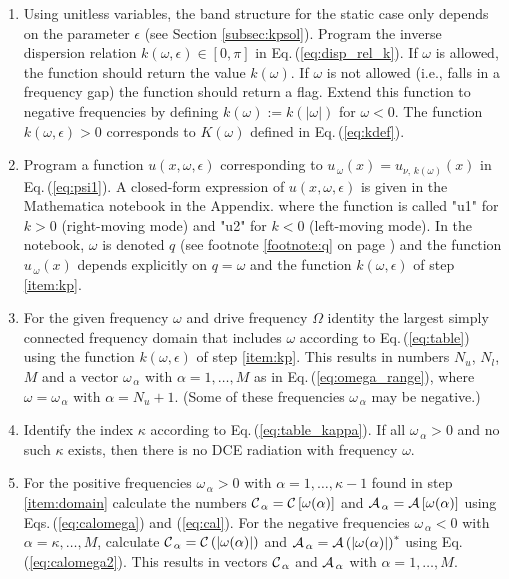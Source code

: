 \begin{enumerate}

\item \label{item:kp} 
Using unitless variables,
the band structure for the static case only depends on the parameter $\epsilon$
(see Section \ref{subsec:kpsol}).
Program the inverse dispersion relation $k(\omega, \epsilon) \in [0, \pi]$ 
in Eq.\,(\ref{eq:disp_rel_k}). 
If $\omega$ is allowed, the function should return the value $k(\omega)$. If $\omega$ is not allowed 
(i.e., falls in a frequency gap) the function should return a flag.
Extend this function to negative frequencies by defining $k(\omega) := k(|\omega|)$ for $\omega < 0$.
The function $k(\omega, \epsilon) > 0$ corresponds to $K(\omega)$ defined in Eq.\,(\ref{eq:kdef}).

\item \label{item:u}
Program a function $u(x, \omega, \epsilon)$ corresponding to 
$u_{\,\omega}(x) = u_{\nu, \, k(\omega)}(x)$ in Eq.\,(\ref{eq:psi1}).
A closed-form expression of $u(x, \omega, \epsilon)$ is given in the Mathematica notebook in the Appendix. 
%
where the function is called "u1" for $k>0$ (right-moving mode) and "u2" for $k<0$ (left-moving mode). 
In the notebook, $\omega$ is denoted $q$
(see footnote \ref{footnote:q} on page \pageref{footnote:q}) and the function 
$u_{\,\omega}(x)$ depends explicitly on $q = \omega$ and the function 
$k(\omega,\epsilon)$ of step \ref{item:kp}.
        
\item  \label{item:domain}
For the given frequency $\omega$ and drive frequency $\Omega$ identity the largest simply connected 
frequency domain that includes $\omega$ according to Eq.\,(\ref{eq:table}) using the function $k(\omega,\epsilon)$
of step \ref{item:kp}. This results in numbers
$N_u$, $N_l$, $M$ and a vector $\omega_{\,\alpha}$ with $\alpha = 1, \ldots, M$ as in 
Eq.\,(\ref{eq:omega_range}), where $\omega = \omega_{\,\alpha}$ with $\alpha = N_u + 1$.
(Some of these frequencies $\omega_{\,\alpha}$ may be negative.)

\item \label{item:kappa} 
Identify the index $\kappa$ according to Eq.\,(\ref{eq:table_kappa}). 
If all $\omega_{\,\alpha} > 0$ and no such $\kappa$ exists, then there is no DCE radiation with frequency $\omega$.

\item For the positive frequencies $\omega_{\,\alpha}>0$ with $\alpha = 1, \ldots, \kappa-1$
found in step \ref{item:domain} 
calculate the numbers ${\cal C}_{\,\alpha} = {\cal C}\left[\omega(\alpha)\right]$ and 
${\cal A}_{\,\alpha} = {\cal A}\left[\omega(\alpha)\right]$ using Eqs.\,(\ref{eq:calomega}) and (\ref{eq:cal}).
For the negative frequencies $\omega_{\,\alpha}<0$ with $\alpha = \kappa, \ldots, M$, 
calculate ${\cal C}_{\,\alpha} = {\cal C}\left(|\omega(\alpha)|\right)$ and
${\cal A}_{\,\alpha} = {\cal A}\left(|\omega(\alpha)|\right)^*$
using Eq.\,(\ref{eq:calomega2}).
This results in vectors ${\cal C}_{\,\alpha}$ and ${\cal A}_{\,\alpha}$ 
with $\alpha = 1, \ldots, M$.


\end{enumerate}
